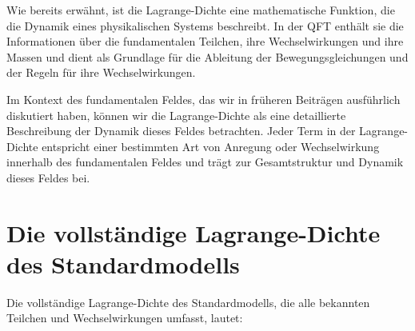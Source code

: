 \documentclass{article}
\begin{document}
	Wie bereits erwähnt, ist die Lagrange-Dichte eine mathematische Funktion, die die Dynamik eines physikalischen Systems beschreibt. In der QFT enthält sie die Informationen über die fundamentalen Teilchen, ihre Wechselwirkungen und ihre Massen und dient als Grundlage für die Ableitung der Bewegungsgleichungen und der Regeln für ihre Wechselwirkungen.
	
	Im Kontext des fundamentalen Feldes, das wir in früheren Beiträgen ausführlich diskutiert haben, können wir die Lagrange-Dichte als eine detaillierte Beschreibung der Dynamik dieses Feldes betrachten. Jeder Term in der Lagrange-Dichte entspricht einer bestimmten Art von Anregung oder Wechselwirkung innerhalb des fundamentalen Feldes und trägt zur Gesamtstruktur und Dynamik dieses Feldes bei.
	
	\section{Die vollständige Lagrange-Dichte des Standardmodells}
	
	Die vollständige Lagrange-Dichte des Standardmodells, die alle bekannten Teilchen und Wechselwirkungen umfasst, lautet:
	
\end{document}
